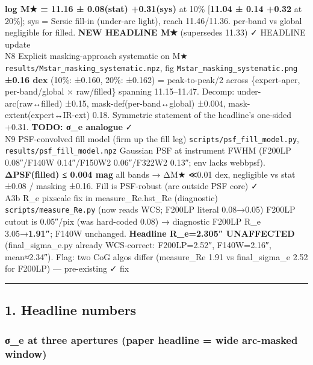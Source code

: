 \documentclass[
  10pt,
]{article}
\begin{document}
\textbar{} \textbf{log M★ = 11.16 ± 0.08(stat) +0.31(sys)} at 10\% {[}\textbf{11.04 ± 0.14 +0.32} at 20\%{]}; sys = Sersic fill-in (under-arc light), reach 11.46/11.36. per-band vs global negligible
for filled. \textbf{NEW HEADLINE M★} (supersedes 11.33) \textbar{} ✓ HEADLINE update \textbar{}\\
N8 \textbar{} Explicit masking-approach systematic on M★ \textbar{} \texttt{results/Mstar\_masking\_systematic.npz}, fig \texttt{Mstar\_masking\_systematic.png} \textbar{} \textbf{±0.16 dex} (10\%:
±0.160, 20\%: ±0.162) = peak-to-peak/2 across \{expert-aper, per-band/global × raw/filled\} spanning 11.15--11.47. Decomp: under-arc(raw↔filled) ±0.15, mask-def(per-band↔global) ±0.004,
mask-extent(expert↔IR-ext) 0.18. Symmetric statement of the headline's one-sided +0.31. \textbf{TODO: σ\_e analogue} \textbar{} ✓ \textbar{}\\
N9 \textbar{} PSF-convolved fill model (firm up the fill leg) \textbar{} \texttt{scripts/psf\_fill\_model.py}, \texttt{results/psf\_fill\_model.npz} \textbar{} Gaussian PSF at instrument FWHM (F200LP
0.08″/F140W 0.14″/F150W2 0.06″/F322W2 0.13″; env lacks webbpsf). \textbf{ΔPSF(filled) ≤ 0.004 mag} all bands → ΔM★ ≪0.01 dex, negligible vs stat ±0.08 / masking ±0.16. Fill is PSF-robust (arc outside
PSF core) \textbar{} ✓ \textbar{}\\
A3b \textbar{} R\_e pixscale fix in measure\_Re.hst\_Re (diagnostic) \textbar{} \texttt{scripts/measure\_Re.py} (now reads WCS; F200LP literal 0.08→0.05) \textbar{} F200LP cutout is 0.05″/pix (was
hard-coded 0.08) → diagnostic F200LP R\_e 3.05→\textbf{1.91″}; F140W unchanged. \textbf{Headline R\_e=2.305″ UNAFFECTED} (final\_sigma\_e.py already WCS-correct: F200LP=2.52″, F140W=2.16″,
mean≈2.34″). Flag: two CoG algos differ (measure\_Re 1.91 vs final\_sigma\_e 2.52 for F200LP) --- pre-existing \textbar{} ✓ fix \textbar{}

\begin{center}\rule{0.5\linewidth}{0.5pt}\end{center}

\hypertarget{headline-numbers}{%
\subsection{1. Headline numbers}\label{headline-numbers}}

\hypertarget{ux3c3_e-at-three-apertures-paper-headline-wide-arc-masked-window}{%
\subsubsection{σ\_e at three apertures (paper headline = wide arc-masked window)}\label{ux3c3_e-at-three-apertures-paper-headline-wide-arc-masked-window}}
\end{document}
